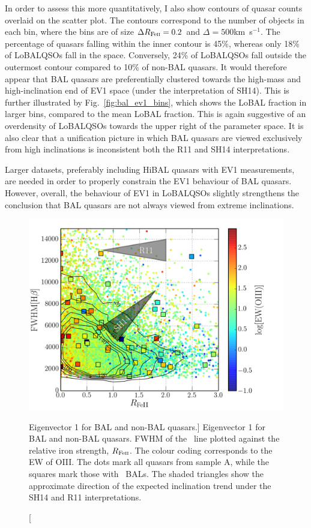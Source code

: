 In order to assess this more quantitatively, I also show contours of 
quasar counts overlaid on the scatter plot. The contours correspond
to the number of objects in each bin, where the bins are of size
$\Delta R_{{\rm Fe \textsc{ii}}} = 0.2$ and $\Delta$\fwh$=500$km~s$^{-1}$.
The percentage of quasars falling within the inner contour is 45\%, 
whereas only 18\% of LoBALQSOs fall in the space. Conversely, 24\% 
of LoBALQSOs fall outside the outermost contour compared to 10\% of 
non-BAL quasars. It would therefore appear that BAL 
quasars are preferentially clustered towards the high-mass and 
high-inclination end of EV1 space (under the interpretation of SH14).
This is further illustrated by Fig.~\ref{fig:bal_ev1_bins},
which shows the LoBAL fraction in larger bins, compared to the 
mean LoBAL fraction. This is again suggestive of an overdensity of LoBALQSOs 
towards the upper right of the parameter space.
It is also clear that a unification picture in which BAL 
quasars are viewed exclusively from high inclinations is 
inconsistent both the R11 and SH14 interpretations. 

Larger datasets, preferably including HiBAL quasars with EV1 measurements, 
are needed in order to properly constrain the EV1 behaviour of BAL quasars.
However, overall, the behaviour of EV1 in LoBALQSOs slightly 
strengthens the conclusion that BAL quasars are not always viewed from 
extreme inclinations.

\begin{figure}
\centering
\includegraphics[width=1.0\textwidth]{figures/ewpaper/ev1.png}
\caption
[Eigenvector 1 for BAL and non-BAL quasars.]
{
Eigenvector 1 for BAL and non-BAL quasars. 
FWHM of the \hb\ line plotted against the relative
iron strength, $R_{{\rm Fe \textsc{ii}}}$. The colour coding
corresponds to the EW of OIII. The dots mark all quasars from
sample A, while the squares mark those with \mgii\ BALs.
The shaded triangles show the approximate 
direction of the expected inclination
trend under the SH14 and R11 interpretations.
}
\label{fig:bal_ev1}
\end{figure}

